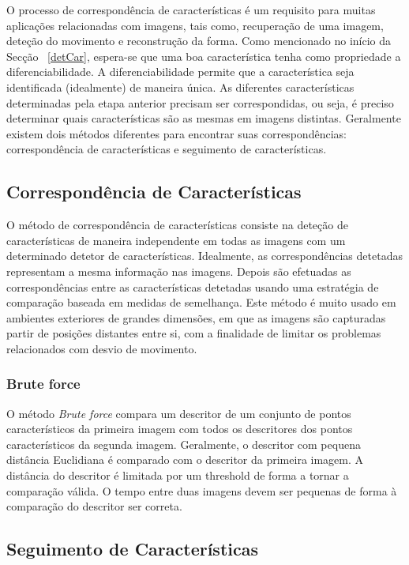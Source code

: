 O processo de correspondência de características é um requisito para muitas aplicações relacionadas com imagens, tais como, recuperação de uma imagem, deteção do movimento e reconstrução da forma. 
Como mencionado no início da Secção ~\ref{detCar}, espera-se que uma boa característica tenha como propriedade a diferenciabilidade. A diferenciabilidade permite que a característica seja identificada (idealmente) de maneira única.
As diferentes características determinadas pela etapa anterior precisam ser correspondidas, ou seja, é preciso determinar quais características são as mesmas em imagens distintas. Geralmente existem dois métodos diferentes para encontrar suas correspondências: correspondência de características e seguimento de características. 


\subsection{Correspondência de Características}

O método de correspondência de características consiste na deteção de características de maneira independente em todas as imagens com um determinado detetor de características.
Idealmente, as correspondências detetadas representam a mesma informação nas imagens.
Depois são efetuadas as correspondências entre as características detetadas usando uma estratégia de comparação baseada em medidas de semelhança.
Este método é muito usado em ambientes exteriores de grandes dimensões, em que as imagens são capturadas partir de posições distantes entre si, com a finalidade de limitar os problemas relacionados com desvio de movimento.

\subsubsection{Brute force}\label{subchap:BRUTE}

O método \textit{Brute force} compara um descritor de um conjunto de pontos característicos da primeira imagem com todos os descritores dos pontos característicos da segunda imagem. Geralmente, o descritor com pequena distância Euclidiana é comparado com o descritor da primeira imagem. A distância do descritor é limitada por um threshold de forma a tornar a comparação válida. O tempo entre duas imagens devem ser pequenas de forma à comparação do descritor ser correta.


\subsection{Seguimento de Características}

